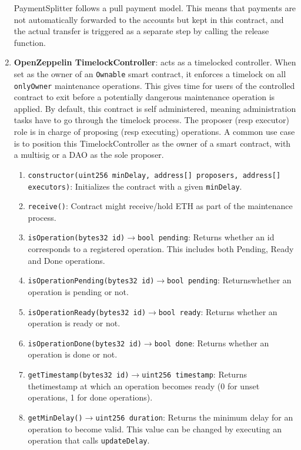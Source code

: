 \begin{enumerate}
PaymentSplitter follows a pull payment model. This means that payments are not automatically forwarded to the accounts but kept in this contract, and the actual transfer is triggered as a separate step by calling the release function.

\item\textbf{OpenZeppelin TimelockController}: acts as a timelocked controller. When set as the owner of an \verb|Ownable| smart contract, it enforces a timelock on all \verb|onlyOwner| maintenance operations. This gives time for users of the controlled contract to exit before a potentially dangerous maintenance operation is applied. By default, this contract is self administered, meaning administration tasks have to go through the timelock process. The proposer (resp executor) role is in charge of proposing (resp executing) operations. A common use case is to position this TimelockController as the owner of a smart contract, with a multisig or a DAO as the sole proposer.
	\begin{enumerate}
	\item\verb|constructor(uint256 minDelay, address[] proposers, address[] executors)|: Initializes the contract with a given \verb|minDelay|.
	\item\verb|receive()|: Contract might receive/hold ETH as part of the maintenance process.
	\item\verb|isOperation(bytes32 id)|$\rightarrow$\verb|bool pending|: Returns whether an id corresponds to a registered operation. This includes both Pending, Ready and Done operations.
	\item\verb|isOperationPending(bytes32 id)|$\rightarrow$\verb|bool pending|: Returns\linebreak whether an operation is pending or not.
	\item\verb|isOperationReady(bytes32 id)|$\rightarrow$\verb|bool ready|: Returns whether an operation is ready or not.
	\item\verb|isOperationDone(bytes32 id)|$\rightarrow$\verb|bool done|: Returns whether an operation is done or not.
	\item\verb|getTimestamp(bytes32 id)|$\rightarrow$\verb|uint256 timestamp|: Returns the\linebreak timestamp at which an operation becomes ready (0 for unset operations, 1 for done operations).
	\item\verb|getMinDelay()|$\rightarrow$\verb|uint256 duration|: Returns the minimum delay for an operation to become valid. This value can be changed by executing an operation that calls \verb|updateDelay|.

\end{enumerate}
\end{enumerate}
